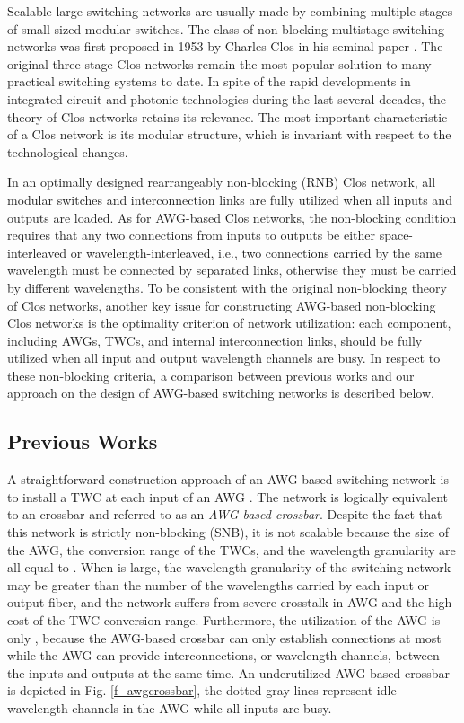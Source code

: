 \documentclass[journal]{IEEEtran}
\begin{document}
Scalable large switching networks are usually made by combining
multiple stages of small-sized modular switches. The class of
non-blocking multistage switching networks was first proposed in
1953 by Charles Clos in his seminal paper \cite{Clos:BSTJ1953}. The
original three-stage Clos networks remain the most popular solution
to many practical switching systems to date. In spite of the rapid
developments in integrated circuit and photonic technologies during
the last several decades, the theory of Clos networks retains its
relevance. The most important characteristic of a Clos network is
its modular structure, which is invariant with respect to the
technological changes.

In an optimally designed rearrangeably non-blocking (RNB) Clos
network, all modular switches and interconnection links are fully
utilized when all inputs and outputs are loaded. As for AWG-based
Clos networks, the non-blocking condition requires that any two
connections from inputs to outputs be either space-interleaved or
wavelength-interleaved, i.e., two connections carried by the same
wavelength must be connected by separated links, otherwise they must
be carried by different wavelengths. To be consistent with the
original non-blocking theory of Clos networks, another key issue for
constructing AWG-based non-blocking Clos networks is the optimality
criterion of network utilization: each component, including AWGs,
TWCs, and internal interconnection links, should be fully utilized
when all input and output wavelength channels are busy. In respect
to these non-blocking criteria, a comparison between previous works
and our approach on the design of AWG-based switching networks is
described below.

\subsection{Previous Works}
A straightforward construction approach of an  AWG-based
switching network is to install a TWC at each input of an  AWG \cite{Blumenthal:JSTQE,Cheyns:PNC2003,Pan:JLT2005}. The
network is logically equivalent to an  crossbar and
referred to as an \emph{AWG-based crossbar}. Despite the fact that
this network is strictly non-blocking (SNB), it is not scalable
because the size of the AWG, the conversion range of the TWCs, and
the wavelength granularity are all equal to . When  is large,
the wavelength granularity of the switching network may be greater
than the number of the wavelengths carried by each input or output
fiber, and the network suffers from severe crosstalk in AWG and the
high cost of the TWC conversion range. Furthermore, the utilization
of the AWG is only , because the AWG-based crossbar can only
establish  connections at most while the AWG can provide 
interconnections, or wavelength channels, between the inputs and
outputs \cite{Ye:JLT2012} at the same time. An underutilized
 AWG-based crossbar is depicted in Fig.
\ref{f_awgcrossbar}, the dotted gray lines represent idle wavelength
channels in the AWG while all inputs are busy.
\end{document}
